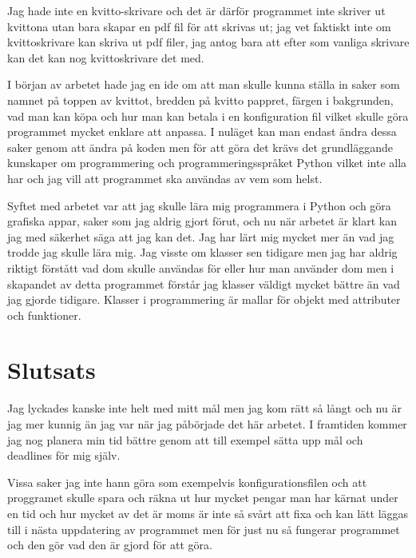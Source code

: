 \documentclass[a4paper, 12pt]{article}
\begin{document}
Jag hade inte en kvitto-skrivare och det är därför programmet inte skriver ut kvittona utan bara skapar en pdf fil för att skrivas ut; jag vet faktiskt inte om kvittoskrivare kan skriva ut pdf filer, jag antog bara att efter som vanliga skrivare kan det kan nog kvittoskrivare det med.


I början av arbetet hade jag en ide om att man skulle kunna ställa in saker som namnet på toppen av kvittot, bredden på kvitto pappret, färgen i bakgrunden, vad man kan köpa och hur man kan betala i en konfiguration fil vilket skulle göra programmet mycket enklare att anpassa. I nuläget kan man endast ändra dessa saker genom att ändra på koden men för att göra det krävs det grundläggande kunskaper om programmering och programmeringsspråket Python vilket inte alla har och jag vill att programmet ska användas av vem som helst.



Syftet med arbetet var att jag skulle lära mig programmera i Python och göra grafiska appar, saker som jag aldrig gjort förut, och nu när arbetet är klart kan jag med säkerhet säga att jag kan det. Jag har lärt mig mycket mer än vad jag trodde jag skulle lära mig. Jag visste om klasser sen tidigare men jag har aldrig riktigt förstått vad dom skulle användas för eller hur man använder dom men i skapandet av detta programmet förstår jag klasser väldigt mycket bättre än vad jag gjorde tidigare. Klasser i programmering är mallar för objekt med attributer och funktioner.


\section{Slutsats}

Jag lyckades kanske inte helt med mitt mål men jag kom rätt så långt och nu är jag mer kunnig än jag var när jag påbörjade det här arbetet.
I framtiden kommer jag nog planera min tid bättre genom att till exempel sätta upp mål och deadlines för mig själv.

Vissa saker jag inte hann göra som exempelvis konfigurationsfilen och att proggramet skulle spara och räkna ut hur mycket pengar man har kärnat under en tid och hur mycket av det är moms är inte så svårt att fixa och kan lätt läggas till i nästa uppdatering av programmet men för just nu så fungerar programmet och den gör vad den är gjord för att göra.


\newpage 

%

\printbibliography
\end{document}
